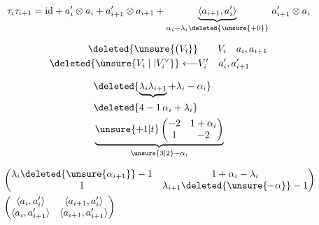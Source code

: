 \[
\tau_i\tau_{i+1}=\mathrm{id}+a'_i\otimes a_i+a'_{i+1}\otimes a_{i+1}
 +\underbrace{\langle a_{i+1},a'_i\rangle}_{\alpha_i-\lambda_i\deleted{\unsure{+0}}}\,a'_{i+1}\otimes a_i
\]

\[
\begin{aligned}
\deleted{\unsure{\bigl( V_i}}&\qquad V_i\quad a_i,a_{i+1}\\
\deleted{\unsure{V_i\mid|V_i^\vee}}\longleftarrow &V'_i\quad a'_i,a'_{i+1}
\end{aligned}
\]


\[
\begin{aligned}
&\deleted{\underbrace{\lambda_i\lambda_{i+1}}+\lambda_i-\alpha_i}\\
&\deleted{4-1\,\alpha_i+\lambda_i}\\
&\underbrace{\unsure{+1|t}\begin{pmatrix}-2&1+\alpha_i\\1&-2\end{pmatrix}}_{\unsure{3|2}-\alpha_i}
\end{aligned}
\]

\[
\begin{aligned}
&\begin{pmatrix}\lambda_i\deleted{\unsure{\alpha_{i+1}}}-1&1+\alpha_i-\lambda_i\\1&\lambda_{i+1}\deleted{\unsure{-\alpha}}-1\end{pmatrix}\\
&\begin{pmatrix}\langle a_i,a'_i\rangle&\langle a_{i+1},a'_i\rangle\\
\langle a_i,a'_{i+1}\rangle&\langle a_{i+1},a'_{i+1}\rangle\end{pmatrix}
\end{aligned}
\]

